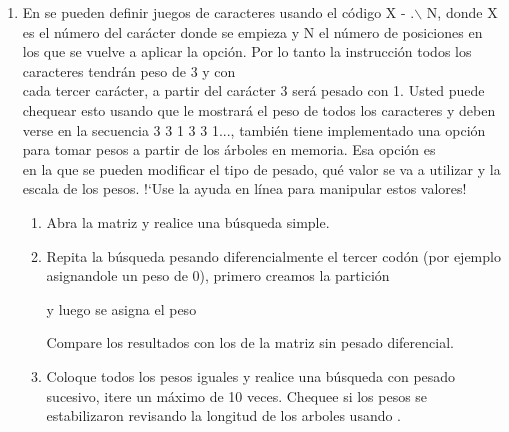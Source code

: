 \begin{enumerate}
	\item En 
	se pueden definir juegos de caracteres usando el c\'odigo X - .$\backslash$ N, donde X es el n\'umero del car\'acter donde se empieza y N el n\'umero de posiciones en los que se vuelve a aplicar la opci\'on. Por lo tanto la instrucci\'on  todos los caracteres tendr\'an peso de 3 y con \\ cada tercer car\'acter, a partir del car\'acter 3 ser\'a pesado con 1. Usted puede chequear esto usando  que le mostrar\'a el peso de todos los caracteres y deben verse en la secuencia 3 3 1 3 3 1...,
	tambi\'en tiene implementado una opci\'on para tomar pesos a partir de los \'arboles en memoria. Esa opci\'on es \\en la que se pueden modificar el tipo de pesado, qu\'e valor se va a utilizar y la escala de los pesos. !`Use la ayuda en l\'inea para manipular estos valores!
	\begin{enumerate}
		\item Abra la matriz y realice una b\'usqueda simple.
		\item Repita la b\'usqueda pesando diferencialmente el tercer cod\'on (por ejemplo asignandole un peso de 0), primero creamos la partici\'on

		y luego se asigna el peso 

		Compare los resultados con los de la matriz sin pesado diferencial.

		\item Coloque todos los pesos iguales y realice una b\'usqueda con pesado sucesivo, itere un m\'aximo de 10 veces. Chequee si los pesos se estabilizaron revisando la longitud de los arboles usando .
	\end{enumerate}
	

\end{enumerate}
